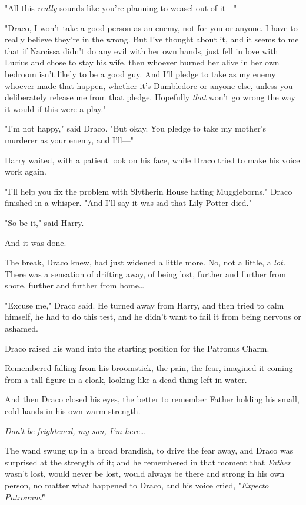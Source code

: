 "All this \emph{really} sounds like you're planning to weasel out of it---"

"Draco, I won't take a good person as an enemy, not for you or anyone. I have 
to really believe they're in the wrong. But I've thought about it, and it seems 
to me that if Narcissa didn't do any evil with her own hands, just fell in love 
with Lucius and chose to stay his wife, then whoever burned her alive in her 
own bedroom isn't likely to be a good guy. And I'll pledge to take as my enemy 
whoever made that happen, whether it's Dumbledore or anyone else, unless you 
deliberately release me from that pledge. Hopefully \emph{that} won't go wrong 
the way it would if this were a play."

"I'm not happy," said Draco. "But okay. You pledge to take my mother's murderer 
as your enemy, and I'll---"

Harry waited, with a patient look on his face, while Draco tried to make his 
voice work again.

"I'll help you fix the problem with Slytherin House hating Muggleborns," Draco 
finished in a whisper. "And I'll say it was sad that Lily Potter died."

"So be it," said Harry.

And it was done.

The break, Draco knew, had just widened a little more. No, not a little, a 
\emph{lot.} There was a sensation of drifting away, of being lost, further and 
further from shore, further and further from home{\ldots}

"Excuse me," Draco said. He turned away from Harry, and then tried to calm 
himself, he had to do this test, and he didn't want to fail it from being 
nervous or ashamed.

Draco raised his wand into the starting position for the Patronus Charm.

Remembered falling from his broomstick, the pain, the fear, imagined it coming 
from a tall figure in a cloak, looking like a dead thing left in water.

And then Draco closed his eyes, the better to remember Father holding his 
small, cold hands in his own warm strength.

\emph{Don't be frightened, my son, I'm here{\ldots}}

The wand swung up in a broad brandish, to drive the fear away, and Draco was 
surprised at the strength of it; and he remembered in that moment that 
\emph{Father} wasn't lost, would never be lost, would always be there and 
strong in his own person, no matter what happened to Draco, and his voice 
cried, "\emph{Expecto Patronum!}"

